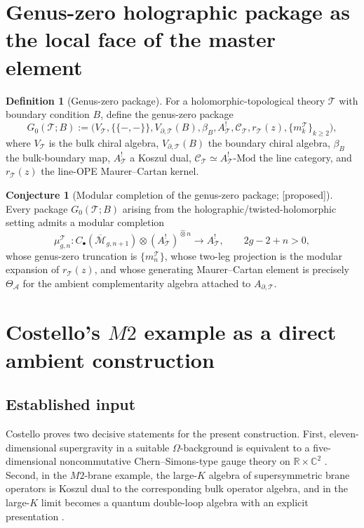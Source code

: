 \documentclass[11pt,oneside]{memoir}
\numberwithin{equation}{chapter}
\theoremstyle{definition}
\newtheorem{definition}[theorem]{Definition}
\newtheorem{conjecture}[theorem]{Conjecture}
\newcommand{\ClaimStatusConjectured}{\textnormal{[proposed]}}
\newcommand{\C}{\mathbb C}
\newcommand{\R}{\mathbb R}
\newcommand{\cA}{\mathcal A}
\newcommand{\cC}{\mathcal C}
\newcommand{\cT}{\mathcal T}
\newcommand{\hot}{\widehat\otimes}
\newcommand{\moduli}{\overline{\mathcal M}}
\begin{document}
\section{Genus-zero holographic package as the local face of the master element}

\begin{definition}[Genus-zero package]
\label{def:genus-zero-package}
For a holomorphic-topological theory \(\cT\) with boundary condition \(B\), define the genus-zero package
\begin{equation}
\label{eq:genus-zero-package}
G_0(\cT;B)
:=
\bigl(
V_{\cT},\{\!\{-,-\}\!\},V_{\partial,\cT}(B),\beta_B,A^!_{\cT},\cC_{\cT},r_{\cT}(z),\{m_k^{\cT}\}_{k\ge 2}
\bigr),
\end{equation}
where \(V_{\cT}\) is the bulk chiral algebra, \(V_{\partial,\cT}(B)\) the boundary chiral algebra, \(\beta_B\) the bulk-boundary map, \(A^!_{\cT}\) a Koszul dual, \(\cC_{\cT}\simeq A_{\cT}^!\text{-Mod}\) the line category, and \(r_{\cT}(z)\) the line-OPE Maurer--Cartan kernel.
\end{definition}

\begin{conjecture}[Modular completion of the genus-zero package; \ClaimStatusConjectured]
\label{conj:modular-completion-package}
Every package \(G_0(\cT;B)\) arising from the holographic/twisted-holomorphic setting admits a modular completion
\[
\mu^{\cT}_{g,n}:C_\bullet(\moduli_{g,n+1})\otimes (A_{\cT}^!)^{\hot n}\to A_{\cT}^!,
\qquad 2g-2+n>0,
\]
whose genus-zero truncation is \(\{m_n^{\cT}\}\), whose two-leg projection is the modular expansion of \(r_{\cT}(z)\), and whose generating Maurer--Cartan element is precisely \(\Theta_{\cA}\) for the ambient complementarity algebra attached to \(A_{\partial,\cT}\).
\end{conjecture}

\section{Costello's \texorpdfstring{$M2$}{M2} example as a direct ambient construction}

\subsection{Established input}

Costello proves two decisive statements for the present construction.  First, eleven-dimensional supergravity in a suitable \(\Omega\)-background is equivalent to a five-dimensional noncommutative Chern--Simons-type gauge theory on \(\R\times\C^2\) \cite{CostelloOmega}.  Second, in the \(M2\)-brane example, the large-\(K\) algebra of supersymmetric brane operators is Koszul dual to the corresponding bulk operator algebra, and in the large-\(K\) limit becomes a quantum double-loop algebra with an explicit presentation \cite{CostelloM2}.
\end{document}
